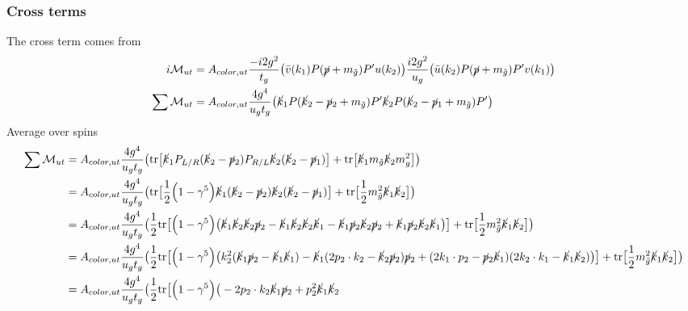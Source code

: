 \documentclass[11pt]{article}
\begin{document}
\subsubsection*{Cross terms}
\begin{flushleft}
The cross term comes from
\begin{align*}
i \mathcal{M}_{ut} &= A_{color, ut}\frac{-i 2 g^2}{t_g}\big( \bar{v} (k_1)  P (\cancel{p} + m_{\tilde{g}}) P'u(k_2) \big)  \frac{i 2 g^2}{u_g} \big( \bar{u} (k_2)  P (\cancel{p} + m_{\tilde{g}}) P' v(k_1) \big)\\
\sum \mathcal{M}_{ut} &= A_{color, ut} \frac{4 g^4}{u_gt_g}\big( \cancel{k}_1   P (\cancel{k}_2 - \cancel{p}_2 + m_{\tilde{g}}) P'\cancel{k}_2  P (\cancel{k}_2 -\cancel{p}_1 + m_{\tilde{g}}) P' \big)\\
\end{align*}
Average over spins
\begin{align*}
\sum  \mathcal{M}_{ut} &=  A_{color, ut} \frac{4 g^4}{u_gt_g}\big( \text{tr} \big[ \cancel{k}_1 P_{L/R} (\cancel{k}_2 - \cancel{p}_2)P_{R/L} \cancel{k}_2(\cancel{k}_2-\cancel{p}_1) \big] + \text{tr} \big[ \cancel{k}_1 m_{\tilde{g}} \cancel{k}_2 m_{g}^2 \big]\big)\\
&= A_{color, ut} \frac{4 g^4}{u_gt_g} \big(
 \text{tr} \big[ \frac{1}{2}\Big(1 - \gamma^5 \Big) \cancel{k}_1 (\cancel{k}_2 - \cancel{p}_2) \cancel{k}_2(\cancel{k}_2-\cancel{p}_1) \big] + \text{tr} \big[\frac{1}{2} m_{\tilde{g}}^2 \cancel{k}_1  \cancel{k}_2\big]
  \big)\\
&= A_{color, ut} \frac{4 g^4}{u_gt_g} \big(
 \frac{1}{2} \text{tr} \big[\Big(1 - \gamma^5 \Big) \big( \cancel{k}_1 \cancel{k}_2 \cancel{k}_2\cancel{p}_2 -  \cancel{k}_1 \cancel{k}_2 \cancel{k}_2\cancel{k}_1 -  \cancel{k}_1 \cancel{p}_2 \cancel{k}_2\cancel{p}_2 +  \cancel{k}_1 \cancel{p}_2 \cancel{k}_2\cancel{k}_1 \big) \big] + \text{tr} \big[\frac{1}{2} m_{\tilde{g}}^2 \cancel{k}_1  \cancel{k}_2\big]
  \big)\\
&= A_{color, ut} \frac{4 g^4}{u_gt_g} \big(
 \frac{1}{2} \text{tr} \big[\Big(1 - \gamma^5 \Big) \big(k_2^2 (\cancel{k}_1 \cancel{p}_2 -  \cancel{k}_1 \cancel{k}_1)
  -  \cancel{k}_1 (2 p_2 \cdot k_2 -  \cancel{k}_2\cancel{p}_2)\cancel{p}_2 +  (2k_1 \cdot p_2 - \cancel{p}_2 \cancel{k}_1 )(2k_2 \cdot k_1 - \cancel{k}_1\cancel{k}_2) \big) \big] + \text{tr} \big[\frac{1}{2} m_{\tilde{g}}^2 \cancel{k}_1  \cancel{k}_2\big]
  \big)\\
 &= A_{color, ut} \frac{4 g^4}{u_gt_g} \big(
 \frac{1}{2} \text{tr} \big[\Big(1 - \gamma^5 \Big) \big(
  -   2 p_2 \cdot k_2\cancel{k}_1\cancel{p}_2 + p_2^2  \cancel{k}_1\cancel{k}_2 \\

\end{align*}
\end{flushleft}
\end{document}
